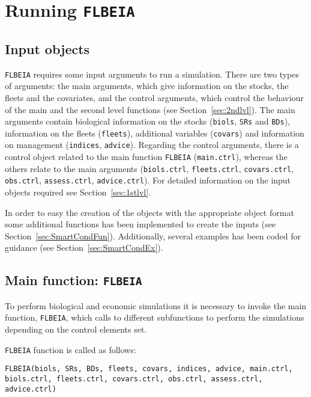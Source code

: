 
\section{Running \texttt{FLBEIA}} \label{sec:FLBEIArun}

\subsection{Input objects}

  \texttt{FLBEIA} requires some input arguments to run a simulation. There are two types of arguments: the main arguments, which give information on 
  the stocks, the fleets and the covariates, and the control arguments, which control the behaviour of the main and the second level functions 
  (see Section~\ref{sec:2ndlvl}). The main arguments contain biological information on the stocks (\texttt{biols}, \texttt{SRs} and 
  \texttt{BDs}), information on the fleets (\texttt{fleets}), additional variables (\texttt{covars}) and information on management 
  (\texttt{indices}, \texttt{advice}). Regarding the control arguments, there is a control object related to the main function 
  \texttt{FLBEIA} (\texttt{main.ctrl}), whereas the others relate to the main arguments (\texttt{biols.ctrl}, \texttt{fleets.ctrl}, 
  \texttt{covars.ctrl}, \texttt{obs.ctrl}, \texttt{assess.ctrl}, \texttt{advice.ctrl}).
  For detailed information on the input objects required see Section~\ref{sec:1stlvl}.
  
  In order to easy the creation of the objects with the appropriate object format some additional functions has been implemented to create the inputs 
  (see Section~\ref{sec:SmartCondFun}). Additionally, several examples has been coded for guidance (see Section~\ref{sec:SmartCondEx}).
  
\subsection{Main function: \texttt{FLBEIA}}

  To perform biological and economic simulations it is necessary to invoke the main function, \texttt{FLBEIA}, which calls to different subfunctions 
  to perform the simulations depending on the control elements set.
  
  \noindent \texttt{FLBEIA} function is called as follows:
  
  \begin{center}
    \texttt{FLBEIA(biols, SRs, BDs, fleets, covars, indices, advice, 
            main.ctrl, biols.ctrl, fleets.ctrl, covars.ctrl, obs.ctrl, assess.ctrl, advice.ctrl) }
	\end{center}
  
